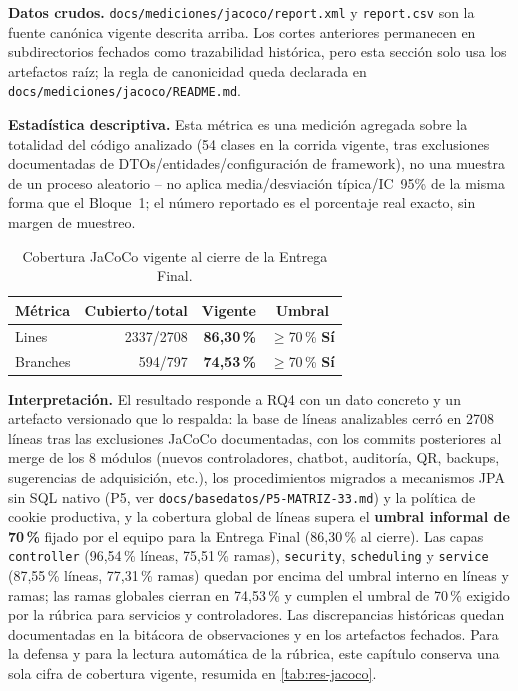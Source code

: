 \textbf{Datos crudos.} \texttt{docs/mediciones/jacoco/report.xml} y
\texttt{report.csv} son la fuente canónica vigente descrita arriba. Los
cortes anteriores permanecen en subdirectorios fechados como trazabilidad
histórica, pero esta sección solo usa los artefactos raíz; la regla de
canonicidad queda declarada en \texttt{docs/mediciones/jacoco/README.md}.

\textbf{Estadística descriptiva.} Esta métrica es una medición agregada
sobre la totalidad del código analizado (54 clases en la corrida
vigente, tras exclusiones documentadas de DTOs/entidades/configuración
de framework), no una muestra de un proceso aleatorio -- no aplica
media/desviación típica/IC~95\% de la misma forma que el Bloque~1; el
número reportado es el porcentaje real exacto, sin margen de muestreo.

\begin{table}[h]
\centering
\small
\begin{tabular}{lrrc}
\toprule
Métrica & Cubierto/total & \textbf{Vigente} & Umbral \\
\midrule
Lines & 2337/2708 & \textbf{86,30\,\%} & $\geq$70\,\% \textbf{Sí} \\
Branches & 594/797 & \textbf{74,53\,\%} & $\geq$70\,\% \textbf{Sí} \\
\bottomrule
\end{tabular}
\caption{Cobertura JaCoCo vigente al cierre de la Entrega Final.}
\label{tab:res-jacoco}
\end{table}

\textbf{Interpretación.} El resultado responde a RQ4 con un dato
concreto y un artefacto versionado que lo respalda: la base de líneas
analizables cerró en 2708 líneas tras las exclusiones JaCoCo documentadas, con los commits
posteriores al merge de los 8 módulos (nuevos controladores, chatbot,
auditoría, QR, backups, sugerencias de adquisición, etc.), los
procedimientos migrados a mecanismos JPA sin SQL nativo (P5, ver
\texttt{docs/basedatos/P5-MATRIZ-33.md}) y la política de cookie
productiva, y la
cobertura global de líneas supera el \textbf{umbral informal de 70\,\%}
fijado por el equipo para la Entrega Final (86,30\,\% al cierre). Las
capas \texttt{controller} (96,54\,\% líneas, 75,51\,\% ramas),
\texttt{security}, \texttt{scheduling} y \texttt{service} (87,55\,\%
líneas, 77,31\,\% ramas) quedan por encima del umbral interno en líneas
y ramas; las ramas globales cierran en 74,53\,\% y cumplen el umbral de
70\,\% exigido por la rúbrica para servicios y controladores.
Las discrepancias históricas quedan documentadas en la bitácora de
observaciones y en los artefactos fechados. Para la defensa y para la
lectura automática de la rúbrica, este capítulo conserva una sola cifra
de cobertura vigente, resumida en \autoref{tab:res-jacoco}.

